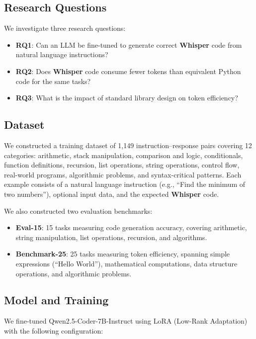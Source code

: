 \documentclass[11pt,a4paper]{article}
\begin{document}
\subsection{Research Questions}

We investigate three research questions:

\begin{itemize}
\item \textbf{RQ1}: Can an LLM be fine-tuned to generate correct
  \textbf{Whisper} code from natural language instructions?
\item \textbf{RQ2}: Does \textbf{Whisper} code consume fewer tokens than
  equivalent Python code for the same tasks?
\item \textbf{RQ3}: What is the impact of standard library design on token
  efficiency?
\end{itemize}

\subsection{Dataset}

We constructed a training dataset of 1,149 instruction--response pairs
covering 12 categories: arithmetic, stack manipulation, comparison and logic,
conditionals, function definitions, recursion, list operations, string
operations, control flow, real-world programs, algorithmic problems, and
syntax-critical patterns. Each example consists of a natural language
instruction (e.g., ``Find the minimum of two numbers''), optional input data,
and the expected \textbf{Whisper} code.

We also constructed two evaluation benchmarks:

\begin{itemize}
\item \textbf{Eval-15}: 15 tasks measuring code generation accuracy, covering
  arithmetic, string manipulation, list operations, recursion, and algorithms.
\item \textbf{Benchmark-25}: 25 tasks measuring token efficiency, spanning
  simple expressions (``Hello World''), mathematical computations, data structure
  operations, and algorithmic problems.
\end{itemize}

\subsection{Model and Training}

We fine-tuned Qwen2.5-Coder-7B-Instruct using LoRA (Low-Rank Adaptation) with
the following configuration:
\end{document}
